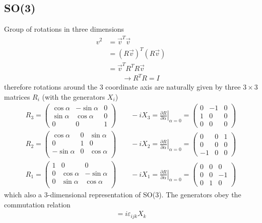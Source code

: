 \documentclass[../main.tex]{subfiles}
\begin{document}
\subsection{SO(3)}

Group of rotations in three dimensions
\begin{align}
v^2
&=\vec{v}^T\vec{v}\\
&=(R\vec{v})^T(R\vec{v})\\
&=\vec{v}^TR^TR\vec{v}\\
&\qquad \rightarrow R^TR=I
\end{align}
therefore rotations around the 3 coordinate axis are naturally given by three  $3\times3$ matrices $R_i$ (with the generators $X_i$)
\begin{align}
R_3=\left(\begin{matrix}
\cos\alpha  & -\sin\alpha & 0\\
\sin\alpha & \cos\alpha & 0\\
0 & 0 & 1 
\end{matrix}\right)
\qquad
-iX_3=\left.\frac{\partial R}{\partial\alpha}\right|_{\alpha=0}=\left(\begin{matrix}
0 & -1 & 0\\
1 & 0  & 0\\
0 & 0  & 0
\end{matrix}\right)\\
R_2=\left(\begin{matrix}
\cos\alpha  & 0 & \sin\alpha\\
0 & 1 & 0\\
-\sin\alpha & 0 & \cos\alpha\\
\end{matrix}\right)
\qquad
-iX_2=\left.\frac{\partial R}{\partial\alpha}\right|_{\alpha=0}=\left(\begin{matrix}
0 & 0  & 1\\
0 & 0  & 0\\
-1 & 0  & 0
\end{matrix}\right)\\
R_1=\left(\begin{matrix}
1 & 0 & 0 \\
0 & \cos\alpha & -\sin\alpha\\
0 & \sin\alpha &  \cos\alpha\\
\end{matrix}\right)
\qquad
-iX_1=\left.\frac{\partial R}{\partial\alpha}\right|_{\alpha=0}=\left(\begin{matrix}
0 & 0  & 0\\
0 & 0  & -1\\
0 & 1  & 0
\end{matrix}\right)
\end{align}  
which also a 3-dimensional representation of SO(3). The generators obey the commutation relation 
\begin{align}
[X_i,X_i]=i\varepsilon_{ijk}X_k
\end{align}
\end{document}
